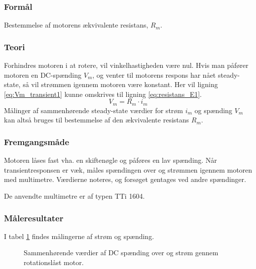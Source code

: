\subsubsection{Formål}
Bestemmelse af motorens ækvivalente resistans, \(R_m\).
\subsubsection{Teori}
Forhindres motoren i at rotere, vil vinkelhastigheden være nul.
Hvis man påfører motoren en DC-spænding \(V_m\),
og venter til motorens respons har nået steady-state,
så vil strømmen igennem motoren være konstant.
Her vil ligning \ref{eq:Vm_transient1} kunne omskrives til ligning \ref{eq:resistans_E1}.
\begin{equation}
	V_m=R_m \cdot i_m
	\label{eq:resistans_E1} 
 \end{equation}
Målinger af sammenhørende steady-state værdier for strøm \(i_m\) og spænding \(V_m\)
kan altså bruges til bestemmelse af den ækvivalente resistans \(R_m\).
\subsubsection{Fremgangsmåde}
Motoren låses fast vha. en skiftenøgle og påføres en lav spænding.
Når transientresponsen er væk,
måles spændingen over og strømmen igennem motoren med multimetre.
Værdierne noteres, og forsøget gentages ved andre spændinger.

De anvendte multimetre er af typen TTi 1604.
\subsubsection{Måleresultater}
I tabel \ref{tb:resistans} findes målingerne af strøm og spænding.
\begin{figure}[th!]
	\centering
	
	\captionsetup{type=table}
	\caption[Sammenhørende værdier af DC spænding og strøm]
			{Sammenhørende værdier af DC spænding over og strøm gennem rotationslåst motor.}
	\label{tb:resistans}
\end{figure}
